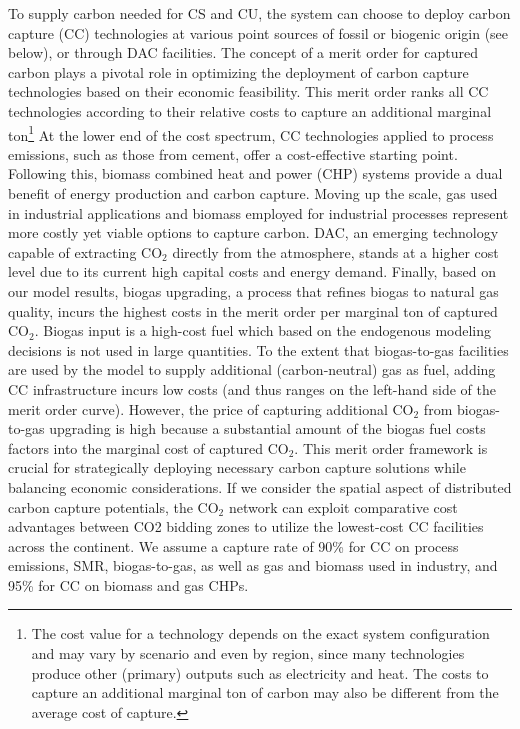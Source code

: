\documentclass[twocolumn]{article}
\newcommand{\COtwo}{CO$_2$}
\begin{document}
To supply carbon needed for CS and CU, the system can choose to deploy carbon capture (CC) technologies at various point sources of fossil or biogenic origin (see below), or through DAC facilities.
The concept of a merit order for captured carbon plays a pivotal role in optimizing the deployment of carbon capture technologies based on their economic feasibility.
This merit order ranks all CC technologies according to their relative costs to capture an additional marginal ton\footnote[2]{The cost value for a technology depends on the exact system configuration and may vary by scenario and even by region, since many technologies produce other (primary) outputs such as electricity and heat. The costs to capture an additional marginal ton of carbon may also be different from the average cost of capture.}
At the lower end of the cost spectrum, CC technologies applied to process emissions, such as those from cement, offer a cost-effective starting point.
Following this, biomass combined heat and power (CHP) systems provide a dual benefit of energy production and carbon capture.
Moving up the scale, gas used in industrial applications and biomass employed for industrial processes represent more costly yet viable options to capture carbon.
DAC, an emerging technology capable of extracting \COtwo{} directly from the atmosphere, stands at a higher cost level due to its current high capital costs and energy demand.
Finally, based on our model results, biogas upgrading, a process that refines biogas to natural gas quality, incurs the highest costs in the merit order per marginal ton of captured \COtwo{}.
Biogas input is a high-cost fuel which based on the endogenous modeling decisions is not used in large quantities.
To the extent that biogas-to-gas facilities are used by the model to supply additional (carbon-neutral) gas as fuel, adding CC infrastructure incurs low costs (and thus ranges on the left-hand side of the merit order curve).
However, the price of capturing additional \COtwo{} from biogas-to-gas upgrading is high because a substantial amount of the biogas fuel costs factors into the marginal cost of captured \COtwo{}.
This merit order framework is crucial for strategically deploying necessary carbon capture solutions while balancing economic considerations.
If we consider the spatial aspect of distributed carbon capture potentials, the \COtwo{} network can exploit comparative cost advantages between CO2 bidding zones to utilize the lowest-cost CC facilities across the continent.
We assume a capture rate of 90\% for CC on process emissions, SMR, biogas-to-gas, as well as gas and biomass used in industry, and 95\% for CC on biomass and gas CHPs.
\end{document}
